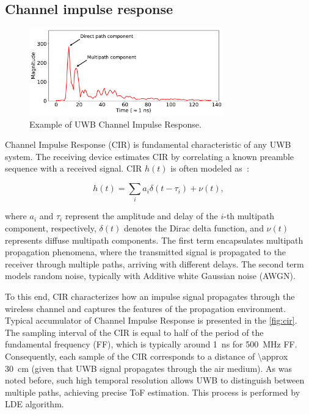 \subsection{Channel impulse response}\label{cir_theory}

\begin{figure}[tbh]
\includegraphics[width=0.75\textwidth]{Graphics/saved_sample.pdf}
\centering
\caption{Example of UWB Channel Impulse Response.}
\label{fig:cir}
\end{figure}

Channel Impulse Response (CIR) is fundamental characteristic of any UWB system. The receiving device estimates CIR by correlating a known preamble sequence with a received signal. CIR $h(t)$ is often modeled as~\cite{cheraghinia2024comprehensive}:

\begin{equation}
h(t) = \sum_{i} a_i \delta(t - \tau_i) + \nu(t),
\end{equation}

where $a_i$ and $\tau_i$ represent the amplitude and delay of the $i$-th multipath component, respectively, $\delta(t)$ denotes the Dirac delta function, and $\nu(t)$ represents diffuse multipath components. The first term encapsulates multipath propagation phenomena, where the transmitted signal is propagated to the receiver through multiple paths, arriving with different delays. The second term models random noise, typically with Additive white Gaussian noise (AWGN).

To this end, CIR characterizes how an impulse signal propagates through the wireless channel and captures the features of the propagation environment. Typical accumulator of Channel Impulse Response is presented in the \autoref{fig:cir}. The sampling interval of the CIR is equal to half of the period of the fundamental frequency (FF), which is typically around \SI{1}{\nano\second} for \SI{500}{\mega\hertz} FF. Consequently, each sample of the CIR corresponds to a distance of \SI{\approx 30}{\centi\metre} (given that UWB signal propagates through the air medium). As was noted before, such high temporal resolution allows UWB to distinguish between multiple paths, achieving precise ToF estimation. This process is performed by LDE algorithm.

